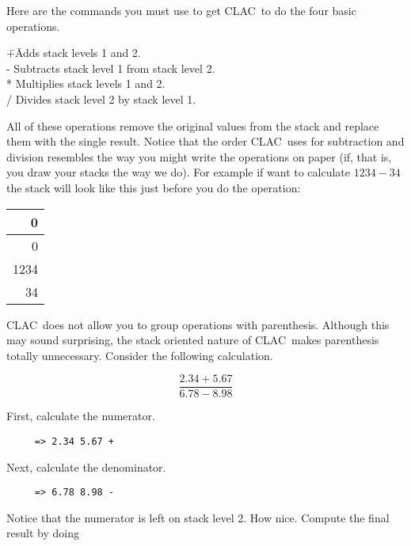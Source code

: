 \documentclass{report}
\newcommand{\CLAC}{CLAC}
\begin{document}
Here are the commands you must use to get \CLAC\ to do the four basic operations.

\begin{tabbing}
\hspace*{3em}\=+\hspace{3em}\=Adds stack levels 1 and 2.\\
\>             -\>            Subtracts stack level 1 from stack level 2.\\
\>             *\>            Multiplies stack levels 1 and 2.\\
\>             /\>            Divides stack level 2 by stack level 1.\\
\end{tabbing}

All of these operations remove the original values from the stack and replace them with the single result. Notice that the order \CLAC\ uses for subtraction and division resembles the way you might write the operations on paper (if, that is, you draw your stacks the way we do). For example if want to calculate $1234 - 34$ the stack will look like this just before you do the operation:

\begin{tabular}{|r|} \hline
    0 \\ \hline
    0 \\ \hline
 1234 \\ \hline
   34 \\ \hline
\end{tabular}

\CLAC\ does not allow you to group operations with parenthesis. Although this may sound surprising, the stack oriented nature of \CLAC\ makes parenthesis totally unnecessary. Consider the following calculation.

\begin{displaymath}
     \frac { 2.34 + 5.67 }{ 6.78 - 8.98 }
\end{displaymath}

First, calculate the numerator.

\begin{verbatim}
     => 2.34 5.67 +
\end{verbatim}

Next, calculate the denominator.

\begin{verbatim}
     => 6.78 8.98 -
\end{verbatim}

Notice that the numerator is left on stack level 2. How nice. Compute the final result by doing
\end{document}
